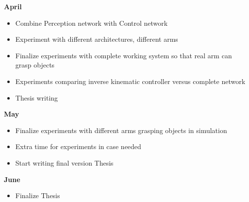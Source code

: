 \textbf{April}
\begin{itemize}
  \item Combine Perception network with Control network
  \item Experiment with different architectures, different arms
  \item Finalize experiments with complete working system so that real arm can grasp objects
  \item Experiments comparing inverse kinematic controller versus complete network
  \item Thesis writing
\end{itemize}
\textbf{May}
\begin{itemize}
  \item Finalize experiments with different arms grasping objects in simulation 
  \item Extra time for experiments in case needed
  \item Start writing final version Thesis
\end{itemize}
\textbf{June}
\begin{itemize}
  \item Finalize Thesis
\end{itemize}








  
  
